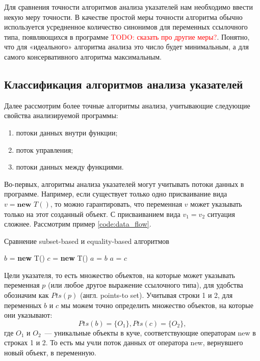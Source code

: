 \documentclass[14pt,titlepage]{extarticle}
\newcommand{\NEW}{\textbf{new }}
\newcommand{\todo}[1]{\textcolor{red}{\eng{TODO}: #1}}
\newcommand{\eng}[1]{{\English#1}}
\begin{document}
      Для сравнения точности алгоритмов анализа указателей нам необходимо ввести
      некую меру точности. В качестве простой меры точности алгоритма обычно
      используется усредненное количество синонимов для переменных ссылочного
      типа, появляющихся в программе \cite{hind_pointer_analysis_not_solved_yet}
      \todo{сказать про другие меры?}.
      Понятно, что для «идеального» алгоритма анализа это число будет
      минимальным, а для самого консервативного алгоритма максимальным.

    \subsection{Классификация алгоритмов анализа указателей}
    \label{section:analysis_overview}

      Далее рассмотрим более точные алгоритмы анализа, учитывающие следующие
      свойства анализируемой программы:
      \begin{enumerate}
        \item потоки данных внутри функции;
        \item поток управления;
        \item потоки данных между функциями.
      \end{enumerate}

      Во-первых, алгоритмы анализа указателей могут учитывать потоки данных в
      программе.
      Например, если существует только одно присваивание вида $v = \NEW T()$,
      то можно гарантировать, что переменная $v$ может указывать только на этот
      созданный объект.
      С присваиванием вида $v_1 = v_2$ ситуация сложнее. Рассмотрим пример
      \ref{code:data_flow}.
      \begin{algorithm}
        \caption{Сравнение \eng{subset-based} и \eng{equality-based} алгоритмов}
        \label{code:data_flow}
        \begin{algorithmic}[1]
          \STATE $b$ = \NEW T()
          \STATE $c$ = \NEW T()
          \STATE $a$ = $b$
          \STATE $a$ = $c$
        \end{algorithmic}
      \end{algorithm}

      Цели указателя, то есть множество объектов, на которые может указывать
      переменная $p$ (или любое другое выражение ссылочного типа), для удобства
      обозначим как $Pts(p)$ (англ. \eng{points-to set}).
      Учитывая строки 1 и 2, для переменных $b$ и $c$ мы можем точно определить
      множество объектов, на которые они указывают:
      \[Pts(b) = \{O_1\}, Pts(c) = \{O_2\},\] где $O_1$ и $O_2$~--- уникальные
      объекты в куче, соответствующие операторам new в строках 1 и 2.
      То есть мы учли поток данных от оператора new, вернувшего новый объект, в
      переменную.
\end{document}
